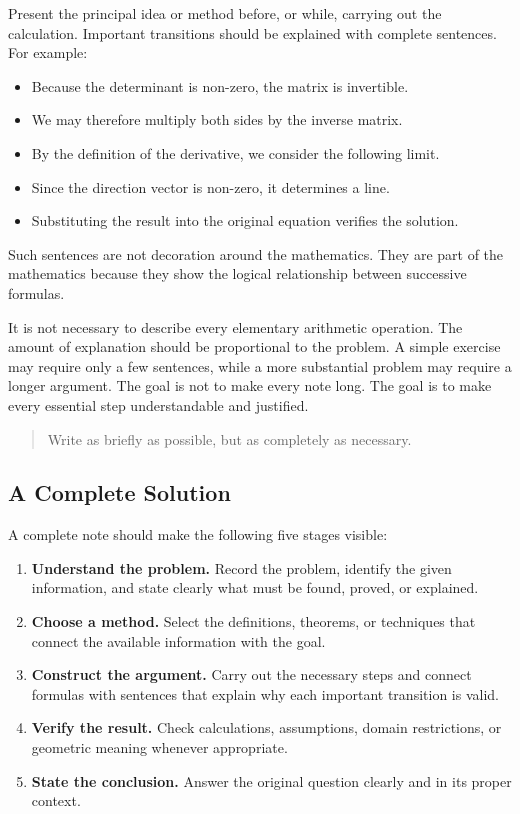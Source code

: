 Present the principal idea or method before, or while, carrying out the
calculation. Important transitions should be explained with complete
sentences. For example:

\begin{itemize}
    \item Because the determinant is non-zero, the matrix is invertible.
    \item We may therefore multiply both sides by the inverse matrix.
    \item By the definition of the derivative, we consider the following limit.
    \item Since the direction vector is non-zero, it determines a line.
    \item Substituting the result into the original equation verifies the
    solution.
\end{itemize}

Such sentences are not decoration around the mathematics. They are part of the
mathematics because they show the logical relationship between successive
formulas.

It is not necessary to describe every elementary arithmetic operation. The
amount of explanation should be proportional to the problem. A simple exercise
may require only a few sentences, while a more substantial problem may require
a longer argument. The goal is not to make every note long. The goal is to make
every essential step understandable and justified.

\begin{quote}
Write as briefly as possible, but as completely as necessary.
\end{quote}

\subsection{A Complete Solution}

A complete note should make the following five stages visible:

\begin{enumerate}
    \item \textbf{Understand the problem.}
    Record the problem, identify the given information, and state clearly what
    must be found, proved, or explained.

    \item \textbf{Choose a method.}
    Select the definitions, theorems, or techniques that connect the available
    information with the goal.

    \item \textbf{Construct the argument.}
    Carry out the necessary steps and connect formulas with sentences that
    explain why each important transition is valid.

    \item \textbf{Verify the result.}
    Check calculations, assumptions, domain restrictions, or geometric meaning
    whenever appropriate.

    \item \textbf{State the conclusion.}
    Answer the original question clearly and in its proper context.
\end{enumerate}

